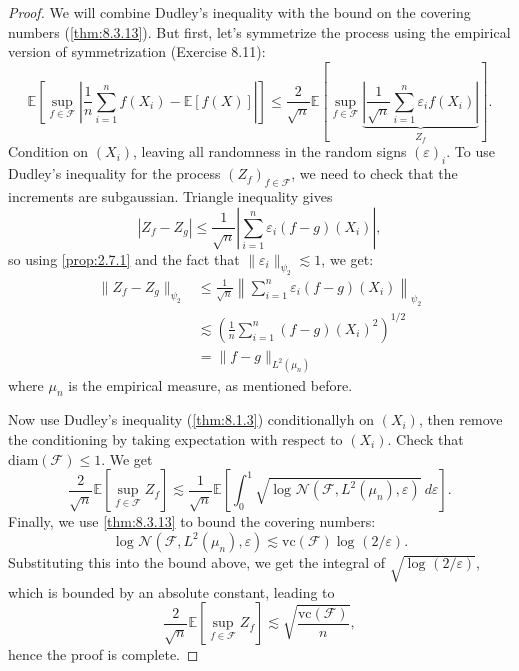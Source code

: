 \begin{proof}
We will combine Dudley's inequality with the bound on the covering numbers (\cref{thm:8.3.13}). But first, 
let's symmetrize the process using the empirical version of symmetrization (Exercise 8.11):
\[ \mathbb{E}\left[ \sup_{f \in \mathcal{F}} \left| \frac{1}{n}\sum_{i = 1}^{n} f(X_i) - \mathbb{E}\left[ f(X) 
\right] \right| \right] \leq \frac{2}{\sqrt{n}} \mathbb{E}\left[ \sup_{f \in \mathcal{F}} 
\underbrace{\left| \frac{1}{\sqrt{n}}\sum_{i = 1}^{n} \varepsilon_i f(X_i) \right|}_{Z_f} \right]. \]
Condition on $(X_i)$, leaving all randomness in the random signs $(\varepsilon)_i$. To use Dudley's inequality 
for the process $(Z_f)_{f \in \mathcal{F}}$, we need to check that the increments are subgaussian. Triangle 
inequality gives 
\[ |Z_f - Z_g| \leq \frac{1}{\sqrt{n}} \left| \sum_{i = 1}^{n} \varepsilon_i(f - g)(X_i) \right|, \]
so using \cref{prop:2.7.1} and the fact that $\lVert \varepsilon_i \rVert_{\psi_2} \lesssim 1$, we get:
\begin{align*}
	\lVert Z_f - Z_g \rVert_{\psi_2} 
	&\leq \frac{1}{\sqrt{n}} \left\lVert \sum_{i = 1}^{n} \varepsilon_i(f - g)(X_i) \right\rVert_{\psi_2} \\
	&\lesssim \left( \frac{1}{n} \sum_{i = 1}^{n} (f - g)(X_i)^2 \right)^{1/2} \\
	&= \lVert f - g \rVert_{L^2(\mu_n)}
\end{align*}
where $\mu_n$ is the empirical measure, as mentioned before.

Now use Dudley's inequality (\cref{thm:8.1.3}) conditionallyh on $(X_i)$, then remove the conditioning by taking 
expectation with respect to $(X_i)$. Check that $\mathrm{diam}(\mathcal{F}) \leq 1$. We get 
\[ \frac{2}{\sqrt{n}} \mathbb{E}\left[ \sup_{f \in \mathcal{F}} Z_f \right] \lesssim 
\frac{1}{\sqrt{n}} \mathbb{E}\left[ \int_{0}^{1} \sqrt{\log_{}{\mathcal{N}(\mathcal{F}, L^2(\mu_n), 
\varepsilon)}} \ d \varepsilon \right]. \]
Finally, we use \cref{thm:8.3.13} to bound the covering numbers:
\[ \log_{}{\mathcal{N}(\mathcal{F}, L^2(\mu_n), \varepsilon)} \lesssim \mathrm{vc}(\mathcal{F}) 
\log_{}{(2 / \varepsilon)}. \]
Substituting this into the bound above, we get the integral of $\sqrt{\log_{}{(2 / \varepsilon)}}$, which is 
bounded by an absolute constant, leading to 
\[ \frac{2}{\sqrt{n}} \mathbb{E}\left[ \sup_{f \in \mathcal{F}}Z_f \right] \lesssim 
\sqrt{\frac{\mathrm{vc}(\mathcal{F})}{n}}, \]
hence the proof is complete.
\end{proof}

